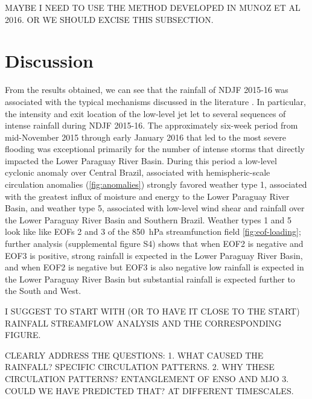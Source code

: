 \documentclass[twocol]{ametsoc}
\begin{document}
MAYBE I NEED TO USE THE METHOD DEVELOPED IN MUNOZ ET AL 2016. OR WE SHOULD EXCISE THIS SUBSECTION.

\section{Discussion}
\label{sec:discussion}

From the results obtained, we can see that the rainfall of NDJF 2015-16 was associated with the typical mechanisms discussed in the literature \citep{Saulo:2007km,Salio:2007gd,Marengo2004,Velasco1987}.
In particular, the intensity and exit location of the low-level jet let to several sequences of intense rainfall during NDJF 2015-16.
The approximately six-week period from mid-November 2015 through early January 2016 that led to the most severe flooding was exceptional primarily for the number of intense storms that directly impacted the Lower Paraguay River Basin.
During this period a low-level cyclonic anomaly over Central Brazil, associated with hemispheric-scale circulation anomalies (\cref{fig:anomalies}) strongly favored weather type 1, associated with the greatest influx of moisture and energy to the Lower Paraguay River Basin, and weather type 5, associated with low-level wind shear and rainfall over the Lower Paraguay River Basin and Southern Brazil.
Weather types 1 and 5 look like like EOFs 2 and 3 of the \SI{850}{\hecto\pascal} streamfunction field \cref{fig:eof-loading}; further analysis (supplemental figure S4) shows that when EOF2 is negative and EOF3 is positive, strong rainfall is expected in the Lower Paraguay River Basin, and when EOF2 is negative but EOF3 is also negative low rainfall is expected in the Lower Paraguay River Basin but substantial rainfall is expected further to the South and West.



I SUGGEST TO START WITH (OR TO HAVE IT CLOSE TO THE START) RAINFALL STREAMFLOW ANALYSIS AND THE CORRESPONDING FIGURE.

CLEARLY ADDRESS THE QUESTIONS:
1. WHAT CAUSED THE RAINFALL? SPECIFIC CIRCULATION PATTERNS.
2. WHY THESE CIRCULATION PATTERNS? ENTANGLEMENT OF ENSO AND MJO
3. COULD WE HAVE PREDICTED THAT? AT DIFFERENT TIMESCALES.
\end{document}
